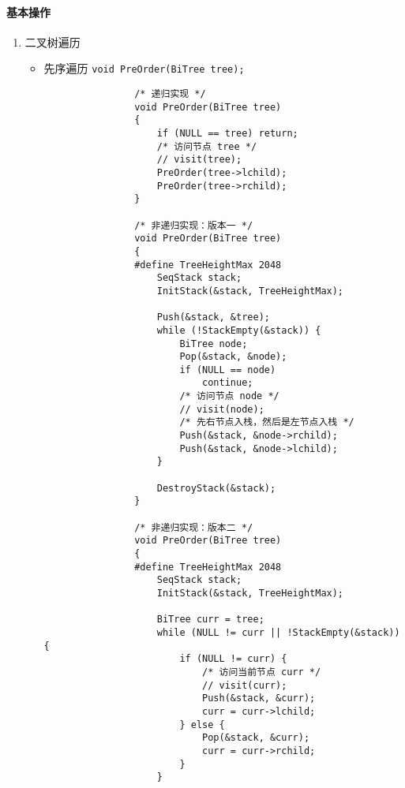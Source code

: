 \documentclass{ctexart}
\begin{document}
\paragraph{基本操作}
\begin{enumerate}
    \item 二叉树遍历
        \begin{itemize}
            \item 先序遍历 \texttt{void PreOrder(BiTree tree);}
                \begin{verbatim}
                /* 递归实现 */
                void PreOrder(BiTree tree)
                {
                    if (NULL == tree) return;
                    /* 访问节点 tree */
                    // visit(tree);
                    PreOrder(tree->lchild);
                    PreOrder(tree->rchild);
                }

                /* 非递归实现：版本一 */
                void PreOrder(BiTree tree)
                {
                #define TreeHeightMax 2048
                    SeqStack stack;
                    InitStack(&stack, TreeHeightMax);

                    Push(&stack, &tree);
                    while (!StackEmpty(&stack)) {
                        BiTree node;
                        Pop(&stack, &node);
                        if (NULL == node)
                            continue;
                        /* 访问节点 node */
                        // visit(node);
                        /* 先右节点入栈，然后是左节点入栈 */
                        Push(&stack, &node->rchild);
                        Push(&stack, &node->lchild);
                    }

                    DestroyStack(&stack);
                }

                /* 非递归实现：版本二 */
                void PreOrder(BiTree tree)
                {
                #define TreeHeightMax 2048
                    SeqStack stack;
                    InitStack(&stack, TreeHeightMax);

                    BiTree curr = tree;
                    while (NULL != curr || !StackEmpty(&stack)) {
                        if (NULL != curr) {
                            /* 访问当前节点 curr */
                            // visit(curr);
                            Push(&stack, &curr);
                            curr = curr->lchild;
                        } else {
                            Pop(&stack, &curr);
                            curr = curr->rchild;
                        }
                    }


\end{verbatim}
\end{itemize}
\end{enumerate}
\end{document}
